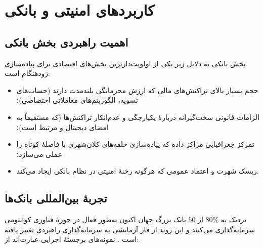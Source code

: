 \chapter{کاربردهای امنیتی و بانکی}
\label{chap:banking}

\section{اهمیت راهبردی بخش بانکی}

بخش بانکی به دلایل زیر یکی از اولویت‌دارترین بخش‌های اقتصادی برای پیاده‌سازی زودهنگام  است:

\begin{itemize}
\item حجم بسیار بالای تراکنش‌های مالی که ارزش محرمانگی بلندمدت دارند (حساب‌های تسویه، الگوریتم‌های معاملاتی اختصاصی)؛
\item الزامات قانونی سخت‌گیرانه دربارهٔ یکپارچگی و عدم‌انکار تراکنش‌ها (که مستقیماً به امضای دیجیتال و  مرتبط است)؛
\item تمرکز جغرافیایی مراکز داده که پیاده‌سازی حلقه‌های  کلان‌شهری با فاصلهٔ کوتاه را عملی می‌سازد؛
\item ریسک شهرت و اعتماد عمومی که هرگونه رخنهٔ امنیتی در نظام بانکی ایجاد می‌کند.
\end{itemize}

\section{تجربهٔ بین‌المللی بانک‌ها}
\label{sec:bankexperience}

نزدیک به $80\%$ از $50$ بانک بزرگ جهان اکنون به‌طور فعال در حوزهٔ فناوری کوانتومی سرمایه‌گذاری می‌کنند و این روند از فاز آزمایشی به سرمایه‌گذاری راهبردی تغییر یافته است \Cite{techinformed2025banks}. نمونه‌های برجستهٔ اجرایی عبارت‌اند از:


